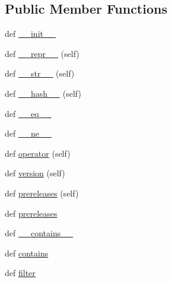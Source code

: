 \subsection*{Public Member Functions}
\begin{DoxyCompactItemize}
\item 
def \hyperlink{classpip_1_1__vendor_1_1packaging_1_1specifiers_1_1__IndividualSpecifier_af9c381845531298e8d3d38f9985eeac6}{\+\_\+\+\_\+init\+\_\+\+\_\+}
\item 
def \hyperlink{classpip_1_1__vendor_1_1packaging_1_1specifiers_1_1__IndividualSpecifier_af39b63f9f00d2fa09e1ad458aa59b3ab}{\+\_\+\+\_\+repr\+\_\+\+\_\+} (self)
\item 
def \hyperlink{classpip_1_1__vendor_1_1packaging_1_1specifiers_1_1__IndividualSpecifier_adfaa0b3a81cff11a0113539a6685ec09}{\+\_\+\+\_\+str\+\_\+\+\_\+} (self)
\item 
def \hyperlink{classpip_1_1__vendor_1_1packaging_1_1specifiers_1_1__IndividualSpecifier_a8084ca1541824534e7af856888435f74}{\+\_\+\+\_\+hash\+\_\+\+\_\+} (self)
\item 
def \hyperlink{classpip_1_1__vendor_1_1packaging_1_1specifiers_1_1__IndividualSpecifier_a4470e7dc123da0a3c9dbf8455fd295ae}{\+\_\+\+\_\+eq\+\_\+\+\_\+}
\item 
def \hyperlink{classpip_1_1__vendor_1_1packaging_1_1specifiers_1_1__IndividualSpecifier_a3afcaaac7b592f3b3e043c7fad9c0c0e}{\+\_\+\+\_\+ne\+\_\+\+\_\+}
\item 
def \hyperlink{classpip_1_1__vendor_1_1packaging_1_1specifiers_1_1__IndividualSpecifier_af17733870e073db53738086a3d3d5345}{operator} (self)
\item 
def \hyperlink{classpip_1_1__vendor_1_1packaging_1_1specifiers_1_1__IndividualSpecifier_a846a9d6b835dd92b19fb330eb1867b66}{version} (self)
\item 
def \hyperlink{classpip_1_1__vendor_1_1packaging_1_1specifiers_1_1__IndividualSpecifier_a6ec252d2b242ab3eae6e075c2cbb2622}{prereleases} (self)
\item 
def \hyperlink{classpip_1_1__vendor_1_1packaging_1_1specifiers_1_1__IndividualSpecifier_afdd5cf6f7a5de558a8cedfa405d0ecc1}{prereleases}
\item 
def \hyperlink{classpip_1_1__vendor_1_1packaging_1_1specifiers_1_1__IndividualSpecifier_a07a83f3eb179f9815b67d27f26c5b04d}{\+\_\+\+\_\+contains\+\_\+\+\_\+}
\item 
def \hyperlink{classpip_1_1__vendor_1_1packaging_1_1specifiers_1_1__IndividualSpecifier_a16a1f1ba6ac7f40015fb7e45771023ea}{contains}
\item 
def \hyperlink{classpip_1_1__vendor_1_1packaging_1_1specifiers_1_1__IndividualSpecifier_a9d4f9960ea82f8f87dfe1e4ab56c8098}{filter}
\end{DoxyCompactItemize}

